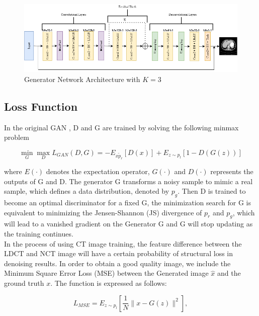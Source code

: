 \documentclass[journal]{IEEEtran}
\begin{document}
\begin{figure}[t!]
    \centering
    \includegraphics[width=15cm]{generator}
    \caption{Generator Network Architecture with $K=3$}
    \label{generator}
\end{figure}	
	
\subsection{Loss Function}
\label{loss function}
In the original GAN \cite{goodfellow2014generative}, D and G are trained by solving the following minmax problem

\begin{equation}
	\mathop{min}_{G}\mathop{max}_{D} L_{GAN}(D,G) = -E_{x \tilde p_r}[D(x)] + E_{z \sim p_l}[1-D(G(z))]
\end{equation}

where $E(\cdot)$ denotes the expectation operator, $G(\cdot)$ and $D(\cdot)$ represents the outputs of G and D.  The generator G transforms a noisy sample to mimic a real sample, which defines a data distribution, denoted by $p_g$.  Then D is trained to become an optimal discriminator for a fixed G, the minimization search for G is equivalent to minimizing the Jensen-Shannon (JS) divergence of $p_r$ and $p_g$, which will lead to a vanished gradient on the Generator G  \cite{8340157} and G will stop updating as the training continues.  \\
	In the process of using CT image training, the feature difference between the LDCT and NCT image will have a certain probability of structural loss in denoising results.  In order to obtain a good quality image, we include the Minimum Square Error Loss (MSE) between the Generated image $\hat{x}$ and the ground truth $x$.  The function is expressed as follows:
	
\begin{equation}
	L_{MSE} = E_{z\sim p_l}\left[ \frac{1}{N}\|x - G(z)\|^2 \right],
\end{equation}
	
\end{document}
